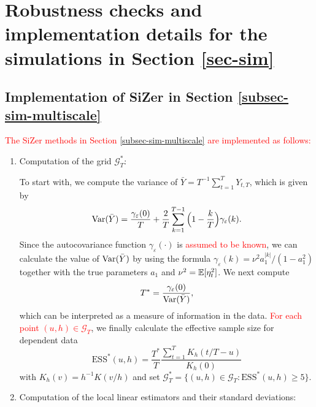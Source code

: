 
\section{Robustness checks and implementation details for the simulations in Section \ref{sec-sim}}\label{sec-supp-sim}


\subsection*{Implementation of SiZer in Section \ref{subsec-sim-multiscale}}


\textcolor{red}{The SiZer methods in Section \ref{subsec-sim-multiscale} are implemented as follows:}
\begin{enumerate}[leftmargin=0.7cm,label=(\alph*)]

\item Computation of the grid $\mathcal{G}_T^*$:

To start with, we compute the variance of $\bar{Y} = T^{-1} \sum_{t=1}^T Y_{t,T}$, which is given by
\[ \textnormal{Var}(\bar{Y}) = \frac{\gamma_\varepsilon(0)}{T} + \frac{2}{T} \sum_{k = 1}^{T-1} \Big(1 - \frac{k}{T}\Big)\gamma_\varepsilon(k). \]
Since the autocovariance function $\gamma_{\varepsilon}(\cdot)$ is \textcolor{red}{assumed to be known}, we can calculate the value of $\textnormal{Var}(\bar{Y})$ by using the formula $\gamma_\varepsilon(k) = \nu^2 a_1^{|k|} / (1 - a_1^2)$ together with the true para\-meters $a_1$ and $\nu^2 = \mathbb{E}[\eta_t^2]$. We next compute 
\[ T^* = \frac{\gamma_\varepsilon(0)}{\textnormal{Var}(\bar{Y})}, \]
which can be interpreted as a measure of information in the data. \textcolor{red}{For each point $(u,h) \in \mathcal{G}_T$}, we finally calculate the effective sample size for dependent data 
\[ \text{ESS}^*(u, h) = \frac{T^*}{T} \frac{\sum_{t=1}^T K_h(t/T - u)}{K_h(0)} \]
with $K_h(v) = h^{-1} K(v/h)$ and set $\mathcal{G}_T^* = \{ (u,h) \in \mathcal{G}_T: \text{ESS}^*(u, h) \ge 5 \}$. 

\item Computation of the local linear estimators and their standard deviations: 


\end{enumerate}
